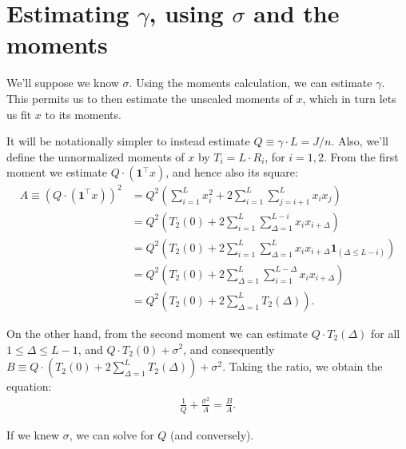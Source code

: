 \documentclass{article}
\theoremstyle{thm}
\theoremstyle{definition}
\newcommand{\1}{\mathbf{1}}
\begin{document}
%
%
%

\section{Estimating $\gamma$, using $\sigma$ and the moments}

We'll suppose we know $\sigma$. Using the moments calculation, we can estimate $\gamma$. This permits us to then estimate the unscaled moments of $x$, which in turn lets us fit $x$ to its moments.

It will be notationally simpler to instead estimate $Q \equiv \gamma \cdot L = J / n$. Also, we'll define the unnormalized moments of $x$ by $T_i = L \cdot R_i$, for $i=1,2$. From the first moment we estimate $Q \cdot (\1^\top x)$, and hence also its square:
%
\begin{align}
%
    A \equiv (Q \cdot (\1^\top x))^2 
    &= Q^2  \left( \sum_{i=1}^L x_i^2 + 2 \sum_{i=1}^L \sum_{j=i+1}^{L} x_i x_j \right)
        \nonumber \\
    &= Q^2 \left( T_2(0) 
            + 2 \sum_{i=1}^{L} \sum_{\Delta=1}^{L-i} x_i x_{i+\Delta}\right)
        \nonumber \\
    &= Q^2 \left( T_2(0) + 2 \sum_{i=1}^L \sum_{\Delta=1}^{L}x_i x_{i+\Delta} 
        \1_{(\Delta \le L-i)} \right)
        \nonumber \\
    &= Q^2 \left( T_2(0) + 2 \sum_{\Delta=1}^L \sum_{i=1}^{L-\Delta}x_i x_{i+\Delta} 
        \right)
        \nonumber \\
    &= Q^2 \left( T_2(0) + 2 \sum_{\Delta=1}^L T_2(\Delta) \right).
%
\end{align}

On the other hand, from the second moment we can estimate $Q \cdot T_2(\Delta)$ for all $1 \le \Delta \le L-1$, and $Q\cdot T_2(0) + \sigma^2$, and consequently $B \equiv Q \cdot (T_2(0) + 2 \sum_{\Delta=1}^L T_2(\Delta)) + \sigma^2$. Taking the ratio, we obtain the equation:
%
\begin{align}
%
    \frac{1}{Q} + \frac{\sigma^2}{A} = \frac{B}{A}.
%
\end{align}

If we knew $\sigma$, we can solve for $Q$ (and conversely).


%
%
%
\end{document}
